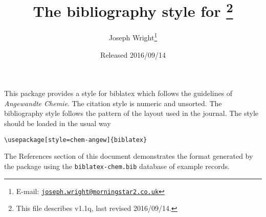 \documentclass[a4paper]{ltxdoc}
\author{Joseph Wright\thanks{E-mail: 
  \href{mailto:joseph.wright@morningstar2.co.uk}
  {\texttt{joseph.wright@morningstar2.co.uk}}}}
\title{The \pkg{chem-angew} bibliography style for \pkg{biblatex}%
  \footnote{This file describes v1.1q, last revised 2016/09/14.}}
\date{Released 2016/09/14}
\providecommand*{\pkg}[1]{\textsf{#1}}
\begin{document}
\maketitle

This package provides a style for \pkg{biblatex} which follows the
guidelines of \emph{Angewandte Chemie}. The citation style is numeric
and unsorted. The bibliography style follows the pattern of the layout
used in the journal. The style should be
loaded in the usual way
\begin{verbatim}
\usepackage[style=chem-angew]{biblatex}
\end{verbatim}
The References section of this document demonstrates the format 
generated by the package using the \texttt{biblatex-chem.bib} database
of example records.

\nocite{*}

\printbibliography
\end{document}
